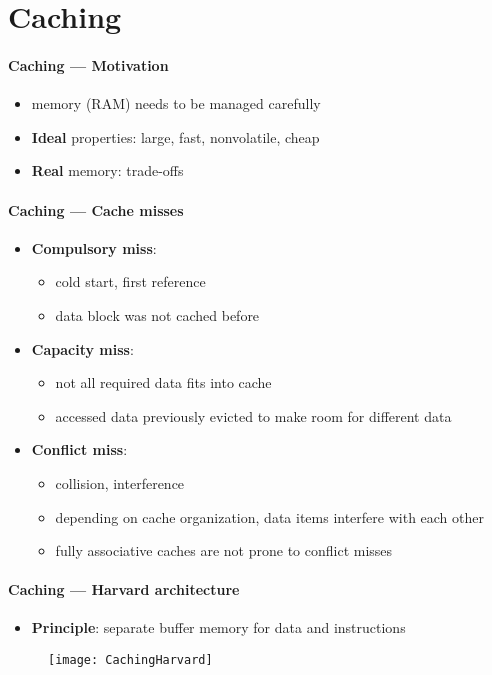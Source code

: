 \section{Caching}

\paragraph{Caching --- Motivation}
\begin{itemize}
  \item memory (RAM) needs to be managed carefully
  \item \textbf{Ideal} properties: large, fast, nonvolatile, cheap
  \item \textbf{Real} memory: trade-offs
\end{itemize}

\paragraph{Caching --- Cache misses}
\begin{itemize}
  \item \textbf{Compulsory miss}:
  \begin{itemize}
    \item cold start, first reference
    \item data block was not cached before
  \end{itemize}
  \item \textbf{Capacity miss}:
  \begin{itemize}
    \item not all required data fits into cache
    \item accessed data previously evicted to make room for different data
  \end{itemize}
  \item \textbf{Conflict miss}:
  \begin{itemize}
    \item collision, interference
    \item depending on cache organization, data items interfere with each other
    \item fully associative caches are not prone to conflict misses
  \end{itemize}
\end{itemize}

\paragraph{Caching --- Harvard architecture}
\begin{itemize}
  \item \textbf{Principle}: separate buffer memory for data and instructions
\end{itemize}
\begin{figure}[h]\centering\label{CachingHarvard}\texttt{[image: CachingHarvard]}\end{figure}


